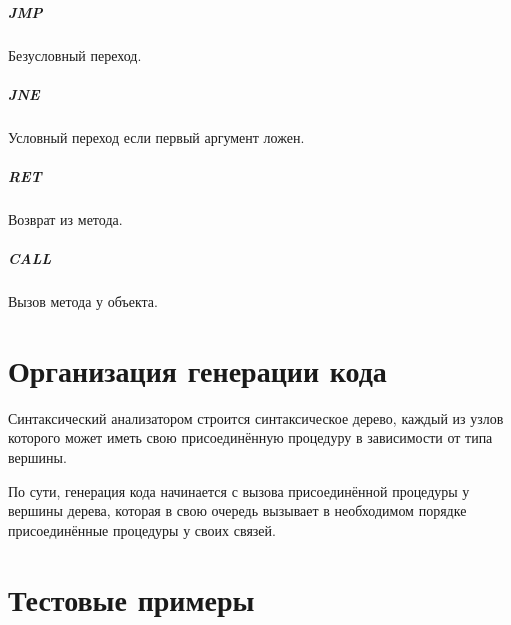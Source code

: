\documentclass[a4paper,12pt,notitlepage,pdftex]{scrreprt}
\begin{document}
    \paragraph{JMP} Безусловный переход.
    \paragraph{JNE} Условный переход если первый аргумент ложен.
    \paragraph{RET} Возврат из метода.
    \paragraph{CALL} Вызов метода у объекта.
\chapter{Организация генерации кода}
    Синтаксический анализатором строится синтаксическое дерево, каждый из узлов которого может иметь свою
    присоединённую процедуру в зависимости от типа вершины.

    По сути, генерация кода начинается с вызова присоединённой процедуры у вершины дерева, которая в свою очередь
    вызывает в необходимом порядке присоединённые процедуры у своих связей.
\chapter{Тестовые примеры}\label{chap:fourth}
        
\end{document}
